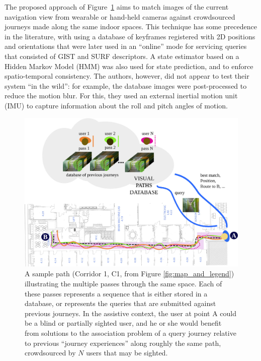 The proposed approach of Figure~\ref{fig:visualpaths} aims to match images of the current navigation view from wearable or hand-held cameras against crowdsourced journeys made along the same indoor spaces. This technique has some precedence in the literature, with \citet{liu2010video} using a database of keyframes registered with 2D positions and orientations that were later used in an ``online'' mode for servicing queries that consisted of GIST and SURF descriptors. A state estimator based on a Hidden Markov Model (HMM) was also used for state prediction, and to enforce spatio-temporal consistency. The authors, however, did not appear to test their system ``in the wild'': for example, the database images were post-processed to reduce the motion blur. For this, they used an external inertial motion unit (IMU) to capture information about the roll and pitch angles of motion. 
\begin{figure}[t]

\begin{center}
\includegraphics[width=\linewidth]{./gfx/Chapter04/corridor.pdf}
\caption{ A sample path (Corridor 1, C1, from Figure \ref{fig:map_and_legend}) illustrating the multiple passes through the same space. Each of these passes represents a sequence that is either stored in a database, or represents the queries that are submitted against previous journeys. In the assistive context, the user at point A could be a blind or partially sighted user, and he or she would benefit from solutions to the association problem of a query journey relative to previous ``journey experiences'' along roughly the same path, crowdsourced by $N$ users that may be sighted.}
\label{fig:visualpaths}
\end{center}
\end{figure}

